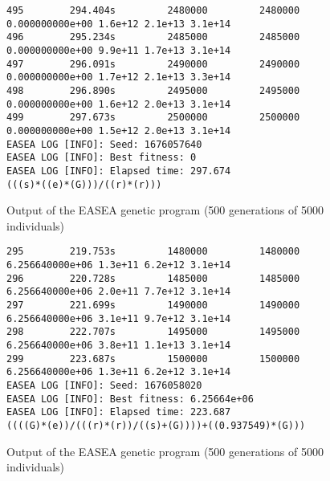 \begin{figure}
    \begin{lstlisting}
495        294.404s         2480000         2480000 0.000000000e+00 1.6e+12 2.1e+13 3.1e+14
496        295.234s         2485000         2485000 0.000000000e+00 9.9e+11 1.7e+13 3.1e+14
497        296.091s         2490000         2490000 0.000000000e+00 1.7e+12 2.1e+13 3.3e+14
498        296.890s         2495000         2495000 0.000000000e+00 1.6e+12 2.0e+13 3.1e+14
499        297.673s         2500000         2500000 0.000000000e+00 1.5e+12 2.0e+13 3.1e+14
EASEA LOG [INFO]: Seed: 1676057640
EASEA LOG [INFO]: Best fitness: 0
EASEA LOG [INFO]: Elapsed time: 297.674
(((s)*((e)*(G)))/((r)*(r)))
\end{lstlisting}
    \caption{Output of the EASEA genetic program (500 generations of 5000
        individuals)}
    \label{gp_1}
\end{figure}

\begin{figure}
    \begin{lstlisting}
295        219.753s         1480000         1480000 6.256640000e+06 1.3e+11 6.2e+12 3.1e+14
296        220.728s         1485000         1485000 6.256640000e+06 2.0e+11 7.7e+12 3.1e+14
297        221.699s         1490000         1490000 6.256640000e+06 3.1e+11 9.7e+12 3.1e+14
298        222.707s         1495000         1495000 6.256640000e+06 3.8e+11 1.1e+13 3.1e+14
299        223.687s         1500000         1500000 6.256640000e+06 1.3e+11 6.2e+12 3.1e+14
EASEA LOG [INFO]: Seed: 1676058020
EASEA LOG [INFO]: Best fitness: 6.25664e+06
EASEA LOG [INFO]: Elapsed time: 223.687
((((G)*(e))/(((r)*(r))/((s)+(G))))+((0.937549)*(G)))
\end{lstlisting}
    \caption{Output of the EASEA genetic program (500 generations of 5000
        individuals)}
    \label{gp_2}
\end{figure}



